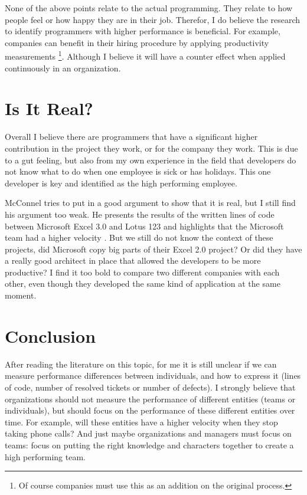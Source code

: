 None of the above points relate to the actual programming.
They relate to how people feel or how happy they are in their job.
Therefor, I do believe the research to identify programmers with higher performance is beneficial. For example, companies can benefit in their hiring procedure by applying productivity measurements
\footnote{Of course companies must use this as an addition on the original process.}.
Although I believe it will have a counter effect when applied continuously in an organization.

\section*{Is It Real?}

Overall I believe there are programmers that have a significant higher contribution in the project they work, or for the company they work.
This is due to a gut feeling, but also from my own experience in the field that developers do not know what to do when one employee is sick or has holidays.
This one developer is key and identified as the high performing employee.

McConnel tries to put in a good argument to show that it is real, but I still find his argument too weak.
He presents the results of the written lines of code between Microsoft Excel 3.0 and Lotus 123 and highlights that the Microsoft team had a higher velocity \autocite[572]{MAKING_SOFTWARE}.
But we still do not know the context of these projects, did Microsoft copy big parts of their Excel 2.0 project?
Or did they have a really good architect in place that allowed the developers to be more productive?
I find it too bold to compare two different companies with each other, even though they developed the same kind of application at the same moment.

\section*{Conclusion}

After reading the literature on this topic, for me it is still unclear if we can measure performance differences between individuals,
and how to express it (lines of code, number of resolved tickets or number of defects).
I strongly believe that organizations should not measure the performance of different entities (teams or individuals),
but should focus on the performance of these different entities over time.
For example, will these entities have a higher velocity when they stop taking phone calls?
And just maybe organizations and managers must focus on teams: focus on putting the right knowledge and characters together to create a high performing team.